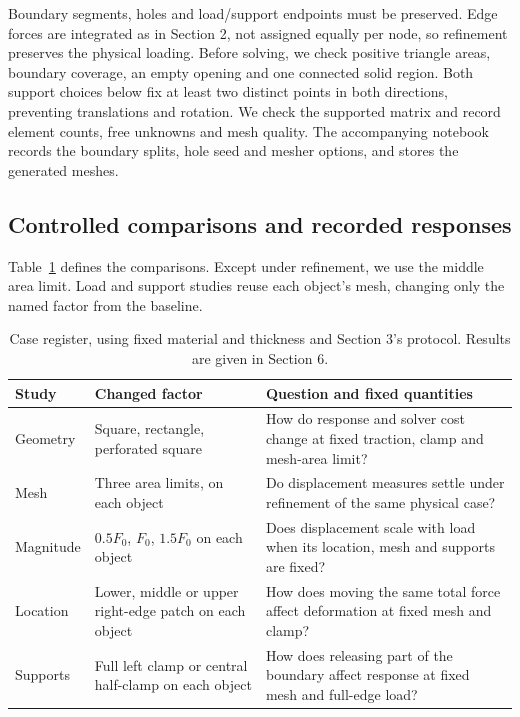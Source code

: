 Boundary segments, holes and load/support endpoints must be preserved.
Edge forces are integrated as in Section 2, not assigned equally per node,
so refinement preserves the physical loading. Before solving, we check
positive triangle areas, boundary coverage, an empty opening and one
connected solid region. Both support choices below fix at least two
distinct points in both directions, preventing translations and rotation.
We check the supported matrix and record element counts, free unknowns
and mesh quality. The accompanying notebook records the boundary splits, hole seed and
mesher options, and stores the generated meshes.

\subsection{Controlled comparisons and recorded responses}
Table~\ref{tab:experiments-register} defines the comparisons. Except
under refinement, we use the middle area limit. Load and support studies
reuse each object's mesh, changing only the named factor from the baseline.

\begin{table}[htbp]
 \centering
 \caption{Case register, using fixed material and thickness
 and Section 3's protocol. Results are given in Section 6.}
 \label{tab:experiments-register}
 \begin{tabularx}{\linewidth}{@{}l>{\raggedright\arraybackslash}X>{\raggedright\arraybackslash}X@{}}
 \toprule
 Study & Changed factor & Question and fixed quantities\\
 \midrule
 Geometry & Square, rectangle, perforated square & How do response and solver cost change at fixed traction, clamp and mesh-area limit?\\
 Mesh & Three area limits, on each object & Do displacement measures settle under refinement of the same physical case?\\
 Magnitude & $0.5F_0$, $F_0$, $1.5F_0$ on each object & Does displacement scale with load when its location, mesh and supports are fixed?\\
 Location & Lower, middle or upper right-edge patch on each object & How does moving the same total force affect deformation at fixed mesh and clamp?\\
 Supports & Full left clamp or central half-clamp on each object & How does releasing part of the boundary affect response at fixed mesh and full-edge load?\\
 \bottomrule
 \end{tabularx}
\end{table}

